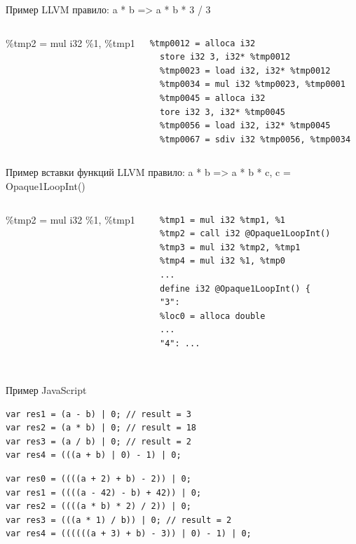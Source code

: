 \documentclass[10pt]{beamer}
\begin{document}
\begin{frame}[fragile]{Пример LLVM}
правило: a * b => a * b * 3 / 3
\begin{columns}
 

\%tmp2 = mul i32 \%1, \%tmp1

\begin{tcolorbox}[colback=green!5,colframe=green!40!black,title=результат]
\begin{verbatim}
%tmp0012 = alloca i32
  store i32 3, i32* %tmp0012
  %tmp0023 = load i32, i32* %tmp0012
  %tmp0034 = mul i32 %tmp0023, %tmp0001
  %tmp0045 = alloca i32
  tore i32 3, i32* %tmp0045
  %tmp0056 = load i32, i32* %tmp0045
  %tmp0067 = sdiv i32 %tmp0056, %tmp0034
\end{verbatim}
\end{tcolorbox}
\end{columns}
\end{frame}

\begin{frame}[fragile]{Пример вставки функций LLVM}
правило: a * b => a * b * c, c = Opaque1LoopInt()
\begin{columns}
     

\%tmp2 = mul i32 \%1, \%tmp1

\begin{tcolorbox}[colback=green!5,colframe=green!40!black,title=результат]
\begin{verbatim}
  %tmp1 = mul i32 %tmp1, %1
  %tmp2 = call i32 @Opaque1LoopInt()
  %tmp3 = mul i32 %tmp2, %tmp1
  %tmp4 = mul i32 %1, %tmp0
  ...
  define i32 @Opaque1LoopInt() {
  "3":
  %loc0 = alloca double
  ...
  "4": ...
  
\end{verbatim}
\end{tcolorbox}
\end{columns}
\end{frame}

\begin{frame}[fragile]{Пример JavaScript}
\begin{tcolorbox}[colback=blue!5,colframe=green!40!black,title=вход]
\begin{verbatim}
var res1 = (a - b) | 0; // result = 3
var res2 = (a * b) | 0; // result = 18
var res3 = (a / b) | 0; // result = 2
var res4 = (((a + b) | 0) - 1) | 0;
\end{verbatim}
\end{tcolorbox}

\begin{tcolorbox}[colback=green!5,colframe=green!40!black,title=результат]
\begin{verbatim}
var res0 = ((((a + 2) + b) - 2)) | 0; 
var res1 = ((((a - 42) - b) + 42)) | 0;
var res2 = ((((a * b) * 2) / 2)) | 0; 
var res3 = (((a * 1) / b)) | 0; // result = 2
var res4 = ((((((a + 3) + b) - 3)) | 0) - 1) | 0; 
\end{verbatim}
\end{tcolorbox}
\end{frame}
\end{document}
